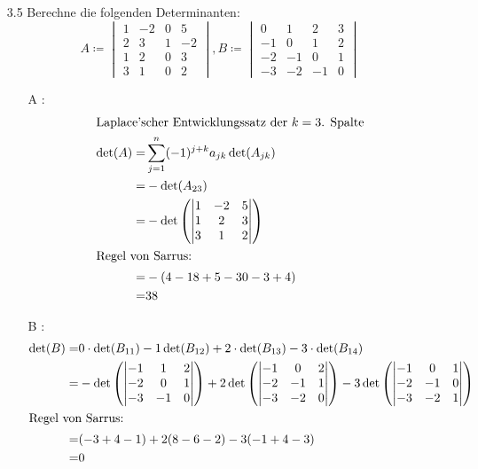 \documentclass{HM}
\begin{document}
\begin{enumerate}
		\item[3.5] Berechne die folgenden Determinanten:
		$$A\coloneqq\begin{vmatrix}
			1&-2&0&5\\
			2&3&1&-2\\
			1&2&0&3\\
			3&1&0&2
		\end{vmatrix},
		B\coloneqq\begin{vmatrix}
			0&1&2&3\\
			-1&0&1&2\\
			-2&-1&0&1\\
			-3&-2&-1&0
		\end{vmatrix}$$
		\begin{enumerate}
		\item[A]:
		\begin{align*}
			\intertext{Laplace'scher Entwicklungssatz der $k=3$. Spalte}
			\det(A)=&\sum\limits_{j=1}^n(-1)^{j+k}a_{jk}\det(A_{jk})\\
			=&-\det(A_{23})\\
			=&-\det\left(\begin{vmatrix}
				1&-2&5\\
				1&2&3\\
				3&1&2
			\end{vmatrix}\right)\\
			\intertext{Regel von Sarrus:}
			=&-(4-18+5-30-3+4)\\
			=&38
		\end{align*}
		\item [B]:
		\begin{align*}
			\det(B)=&0\cdot\det(B_{11})-1\det(B_{12})+2\cdot\det(B_{13})-3\cdot\det(B_{14})\\
			=&-\det\left(\begin{vmatrix}
				-1&1&2\\
				-2&0&1\\
				-3&-1&0
			\end{vmatrix}\right)
			+2\det\left(\begin{vmatrix}
				-1&0&2\\
				-2&-1&1\\
				-3&-2&0
			\end{vmatrix}\right)
			-3\det\left(\begin{vmatrix}
				-1&0&1\\
				-2&-1&0\\
				-3&-2&1
			\end{vmatrix}\right)\\
			\intertext{Regel von Sarrus:}
			=&(-3+4-1)+2(8-6-2)-3(-1+4-3)\\
			=&0
		\end{align*}
		\end{enumerate}
		

\end{enumerate}
\end{document}
